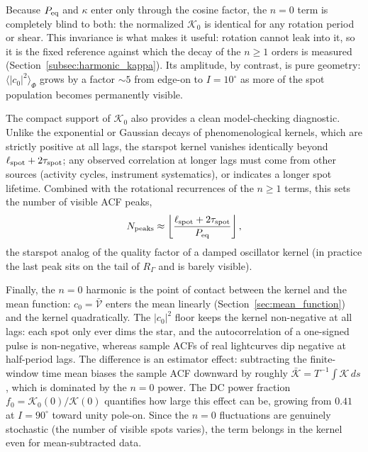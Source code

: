 \documentclass[preprint]{aastex702}
\begin{document}
Because $P_{\rm eq}$ and $\kappa$ enter only through the cosine factor, the $n = 0$ term is completely blind to both: the normalized $\mathcal{K}_0$ is identical for any rotation period or shear. This invariance is what makes it useful: rotation cannot leak into it, so it is the fixed reference against which the decay of the $n \geq 1$ orders is measured (Section~\ref{subsec:harmonic_kappa}). Its amplitude, by contrast, is pure geometry: $\langle|c_0|^2\rangle_\Phi$ grows by a factor ${\sim}5$ from edge-on to $I = 10^\circ$ as more of the spot population becomes permanently visible.

The compact support of $\mathcal{K}_0$ also provides a clean model-checking diagnostic. Unlike the exponential or Gaussian decays of phenomenological kernels, which are strictly positive at all lags, the starspot kernel vanishes identically beyond $\ell_{\rm spot} + 2\tau_{\rm spot}$; any observed correlation at longer lags must come from other sources (activity cycles, instrument systematics), or indicates a longer spot lifetime. Combined with the rotational recurrences of the $n \geq 1$ terms, this sets the number of visible ACF peaks,
\begin{equation}
    N_{\rm peaks} \approx \left\lfloor \frac{\ell_{\rm spot} + 2\tau_{\rm spot}}{P_{\rm eq}} \right\rfloor,
    \label{eq:n_peaks}
\end{equation}
the starspot analog of the quality factor of a damped oscillator kernel (in practice the last peak sits on the tail of $R_\Gamma$ and is barely visible).

Finally, the $n = 0$ harmonic is the point of contact between the kernel and the mean function: $c_0 = \bar{\mathcal{V}}$ enters the mean linearly (Section~\ref{sec:mean_function}) and the kernel quadratically. The $|c_0|^2$ floor keeps the kernel non-negative at all lags: each spot only ever dims the star, and the autocorrelation of a one-signed pulse is non-negative, whereas sample ACFs of real lightcurves dip negative at half-period lags. The difference is an estimator effect: subtracting the finite-window time mean biases the sample ACF downward by roughly $\bar{\mathcal{K}} = T^{-1}\!\int\mathcal{K}\,ds$, which is dominated by the $n = 0$ power. The DC power fraction $f_0 = \mathcal{K}_0(0)/\mathcal{K}(0)$ quantifies how large this effect can be, growing from $0.41$ at $I = 90^\circ$ toward unity pole-on. Since the $n = 0$ fluctuations are genuinely stochastic (the number of visible spots varies), the term belongs in the kernel even for mean-subtracted data.
\end{document}
